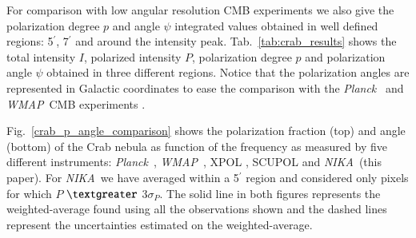 \documentclass[twocolumn,traditabstract]{aa}
\def\NIKA{\textit{NIKA}}
\def\Planck{\textit{Planck}}
\def\WMAP{\textit{WMAP}}
\begin{document}
For comparison with low angular resolution CMB experiments we also give the polarization degree $p$ and angle $\psi$ integrated values obtained in well defined regions: 5$^\prime$, 7$^\prime$ and around the intensity peak.
Tab.~\ref{tab:crab_results} shows the total intensity $I$, polarized intensity $P$, polarization degree $p$ and polarization angle $\psi$ obtained in three different regions. 
Notice that the polarization angles are represented in Galactic coordinates to ease the comparison with the \Planck\ \citep{2015arXiv150702058P} and \WMAP\ CMB experiments \citep{2011ApJS..192...19W}. 

Fig.~\ref{crab_p_angle_comparison} shows the polarization fraction (top) and angle (bottom) of the Crab nebula as function of the frequency as measured by five different instruments: \Planck\ \citep{2015arXiv150702058P}, \WMAP\ \citep{2011ApJS..192...19W}, XPOL \citep{aumont2010}, SCUPOL \citep{scubapol} and \NIKA\ (this paper).
For \NIKA\ we have averaged within a 5$^\prime$ region and considered only pixels for which $P$ $\textgreater$ $3\sigma_P$. 
The solid line in both figures represents the weighted-average found using all the observations shown and the dashed lines represent the uncertainties estimated on the weighted-average. 
\end{document}
